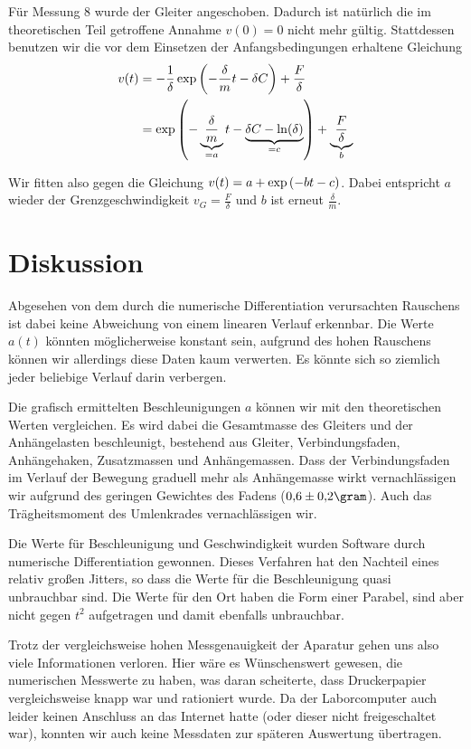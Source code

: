 \documentclass[a4paper,german,12pt,smallheadings]{scrartcl}
\begin{document}
Für Messung 8 wurde der Gleiter angeschoben. Dadurch ist natürlich die im
theoretischen Teil getroffene Annahme $v(0) = 0$ nicht mehr gültig. Stattdessen
benutzen wir die vor dem Einsetzen der Anfangsbedingungen erhaltene Gleichung
\begin{align*}
  v(t) &= -\frac{1}{\delta} \exp \del{ - \frac{\delta}{m} t - \delta C} + \frac{F}{\delta} \\
       &= \exp \del{ - \underbrace{\frac{\delta}{m}}_{=a} t - \underbrace{\delta C - \ln(\delta)}_{=c}} + \underbrace{\frac{F}{\delta}}_{b} \\
\end{align*}

Wir fitten also gegen die Gleichung $v(t) = a + \exp\del{-bt-c}$. Dabei
entspricht $a$ wieder der Grenzgeschwindigkeit $v_G = \frac{F}{\delta}$ und $b$
ist erneut $\frac{\delta}{m}$.


\section*{Diskussion}
Abgesehen
von dem durch die numerische Differentiation verursachten Rauschens ist dabei
keine Abweichung von einem linearen Verlauf erkennbar. Die Werte $a(t)$ könnten
möglicherweise konstant sein, aufgrund des hohen Rauschens können wir
allerdings diese Daten kaum verwerten. Es könnte sich so ziemlich jeder
beliebige Verlauf darin verbergen.

Die grafisch ermittelten Beschleunigungen $a$ können wir mit den theoretischen
Werten vergleichen. Es wird dabei die Gesamtmasse des Gleiters und der
Anhängelasten beschleunigt, bestehend aus Gleiter, Verbindungsfaden,
Anhängehaken, Zusatzmassen und Anhängemassen. Dass der Verbindungsfaden im
Verlauf der Bewegung graduell mehr als Anhängemasse wirkt vernachlässigen wir
aufgrund des geringen Gewichtes des Fadens ($0{,}6 \pm 0{,}2 \gram$). Auch das
Trägheitsmoment des Umlenkrades vernachlässigen wir.

Die Werte für Beschleunigung und Geschwindigkeit wurden Software durch
numerische Differentiation gewonnen. Dieses Verfahren hat den Nachteil eines
relativ großen Jitters, so dass die Werte für die Beschleunigung quasi
unbrauchbar sind. Die Werte für den Ort haben die Form einer Parabel, sind aber
nicht gegen $t^2$ aufgetragen und damit ebenfalls unbrauchbar.

Trotz der vergleichsweise hohen Messgenauigkeit der Aparatur gehen uns also
viele Informationen verloren. Hier wäre es Wünschenswert gewesen, die
numerischen Messwerte zu haben, was daran scheiterte, dass Druckerpapier
vergleichsweise knapp war und rationiert wurde. Da der Laborcomputer auch
leider keinen Anschluss an das Internet hatte (oder dieser nicht freigeschaltet
war), konnten wir auch keine Messdaten zur späteren Auswertung übertragen.
\end{document}
